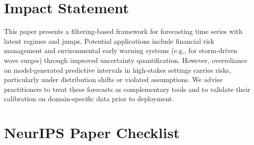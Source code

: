 \documentclass{article}
\begin{document}
\section{Impact Statement}
\label{app:impact}
This paper presents a filtering-based framework for forecasting time series with latent regimes and jumps. Potential applications include financial risk management and environmental early warning systems (e.g., for storm-driven wave surges) through improved uncertainty quantification. However, overreliance on model-generated predictive intervals in high-stakes settings carries risks, particularly under distribution shifts or violated assumptions. We advise practitioners to treat these forecasts as complementary tools and to validate their calibration on domain-specific data prior to deployment.

\newpage
\section*{NeurIPS Paper Checklist}



\end{document}
